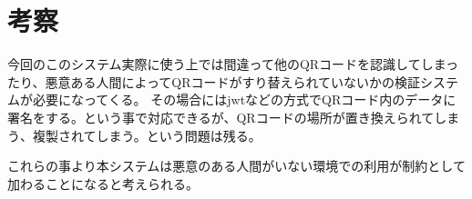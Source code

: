 \section{考察}
今回のこのシステム実際に使う上では間違って他のQRコードを認識してしまったり、悪意ある人間によってQRコードがすり替えられていないかの検証システムが必要になってくる。
その場合にはjwtなどの方式でQRコード内のデータに署名をする。という事で対応できるが、QRコードの場所が置き換えられてしまう、複製されてしまう。という問題は残る。

これらの事より本システムは悪意のある人間がいない環境での利用が制約として加わることになると考えられる。
